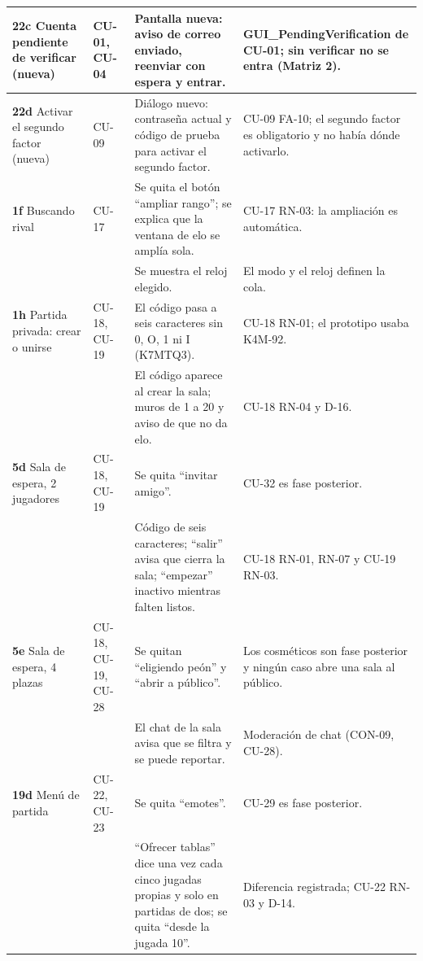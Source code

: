 \begin{center}
\begin{longtable}{|L{0.1\textwidth}|L{0.13\textwidth}|L{0.335\textwidth}|L{0.32\textwidth}|}
\textbf{22c} Cuenta pendiente de verificar (nueva) & \mbox{CU-01}, \mbox{CU-04} & Pantalla nueva: aviso de correo enviado, reenviar con espera y entrar. & GUI\_PendingVerification de \mbox{CU-01}; sin verificar no se entra (Matriz 2). \\ \hline
\textbf{22d} Activar el segundo factor (nueva) & \mbox{CU-09} & Diálogo nuevo: contraseña actual y código de prueba para activar el segundo factor. & \mbox{CU-09} \mbox{FA-10}; el segundo factor es obligatorio y no había dónde activarlo. \\ \hline
\textbf{1f} Buscando rival & \mbox{CU-17} & Se quita el botón ``ampliar rango''; se explica que la ventana de elo se amplía sola. & \mbox{CU-17} \mbox{RN-03}: la ampliación es automática. \\ 
 &  & Se muestra el reloj elegido. & El modo y el reloj definen la cola. \\ \hline
\textbf{1h} Partida privada: crear o unirse & \mbox{CU-18}, \mbox{CU-19} & El código pasa a seis caracteres sin 0, O, 1 ni I (K7MTQ3). & \mbox{CU-18} \mbox{RN-01}; el prototipo usaba K4M-92. \\ 
 &  & El código aparece al crear la sala; muros de 1 a 20 y aviso de que no da elo. & \mbox{CU-18} \mbox{RN-04} y \mbox{D-16}. \\ \hline
\textbf{5d} Sala de espera, 2 jugadores & \mbox{CU-18}, \mbox{CU-19} & Se quita ``invitar amigo''. & \mbox{CU-32} es fase posterior. \\ 
 &  & Código de seis caracteres; ``salir'' avisa que cierra la sala; ``empezar'' inactivo mientras falten listos. & \mbox{CU-18} \mbox{RN-01}, \mbox{RN-07} y \mbox{CU-19} \mbox{RN-03}. \\ \hline
\textbf{5e} Sala de espera, 4 plazas & \mbox{CU-18}, \mbox{CU-19}, \mbox{CU-28} & Se quitan ``eligiendo peón'' y ``abrir a público''. & Los cosméticos son fase posterior y ningún caso abre una sala al público. \\ 
 &  & El chat de la sala avisa que se filtra y se puede reportar. & Moderación de chat (\mbox{CON-09}, \mbox{CU-28}). \\ \hline
\textbf{19d} Menú de partida & \mbox{CU-22}, \mbox{CU-23} & Se quita ``emotes''. & \mbox{CU-29} es fase posterior. \\ 
 &  & ``Ofrecer tablas'' dice una vez cada cinco jugadas propias y solo en partidas de dos; se quita ``desde la jugada 10''. & Diferencia registrada; \mbox{CU-22} \mbox{RN-03} y \mbox{D-14}. \\ \hline

\end{longtable}
\end{center}
